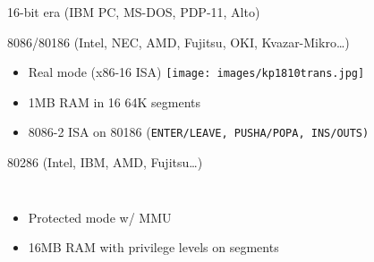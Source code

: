 \documentclass[xcolor={dvipsnames,table}]{beamer}
\begin{document}
\begin{frame}[t]{16-bit era (IBM PC, MS-DOS, PDP-11, Alto)}
\begin{block}{8086/80186 (Intel, NEC, AMD, Fujitsu, OKI, Kvazar-Mikro\ldots)}
\begin{itemize}
\item Real mode (x86-16 ISA) \hfill \texttt{[image: images/kp1810trans.jpg]}
\item 1MB RAM in 16 64K segments
\item 8086-2 ISA on 80186
{\footnotesize
(\tt{ENTER}/\tt{LEAVE}, \tt{PUSHA}/\tt{POPA}, \tt{INS}/\tt{OUTS})
}
\end{itemize}
\end{block}
\begin{block}{80286 (Intel, IBM, AMD, Fujitsu\ldots)}
\begin{columns}
\column{3.4in}
\begin{itemize}
\item Protected mode w/ MMU
\item 16MB RAM with privilege levels on segments
\end{itemize}
\column{.5in}
\end{columns}
\end{block}
\vfill
\begin{center}
\end{center}
\end{frame}
\end{document}
